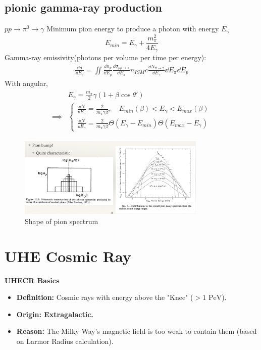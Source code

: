 \documentclass{sciposter}
\begin{document}
\begin{multicols}{3}
\subsection{pionic gamma-ray production}
$pp\rightarrow \pi^{0}\rightarrow \gamma $
Minimum pion energy to produce a photon with energy $E_{\gamma} $ $$E_{min}=E_{\gamma} +\frac{m_{\pi}^{2}  }{4E_{\gamma} }$$ 
Gamma-ray emissivity(photons per volume per time per energy):
\begin{align}
    \frac{\dd{n}}{\dd{E_{\gamma} }}=\iint \frac{\dd{n_{p} }}{\dd{E_{p} }}\frac{\dd{\sigma_{pp \rightarrow \pi} }}{\dd{E_{\pi} }}n_{ISM}c\frac{\dd{N_{\pi \rightarrow \gamma} }}{\dd{E_{\gamma} }}\dd{E_{\pi} }\dd{E_{p} } 
 \end{align}
With angular,
\begin{align}
    \begin{aligned}
        &E_{\gamma}=\frac{m_{\pi} }{2}\gamma (1+\beta \cos \theta') \\
        \implies&\begin{cases}
            \frac{\dd{N}}{\dd{E_{\gamma} }}=\frac{2}{m_{\pi} \gamma \beta},\quad E_{min}(\beta)<E_{\gamma}<E_{max}(\beta)  \\
             \frac{\dd{N}}{\dd{E_{\gamma} }}=\frac{2}{m_{\pi} \gamma \beta}\Theta(E_{\gamma}-E_{min}  )\Theta(E_{max}-E_{\gamma}  )
        \end{cases}
    \end{aligned}
\end{align}


\begin{figure}[ht]
    \centering
    \includegraphics[width= 0.8\textwidth]{2.png}
    \caption{\label{fig:2.png2}
        Shape of pion spectrum
    }
\end{figure}
\section{UHE Cosmic Ray}


\textbf{UHECR Basics}
    \begin{itemize}
        \item \textbf{Definition:} Cosmic rays with energy above the "Knee" ($> 1 \text{ PeV}$).
        \item \textbf{Origin: Extragalactic.}
        \item \textbf{Reason:} The Milky Way's magnetic field is too weak to contain them (based on Larmor Radius calculation).
    \end{itemize}


\end{multicols}
\end{document}
